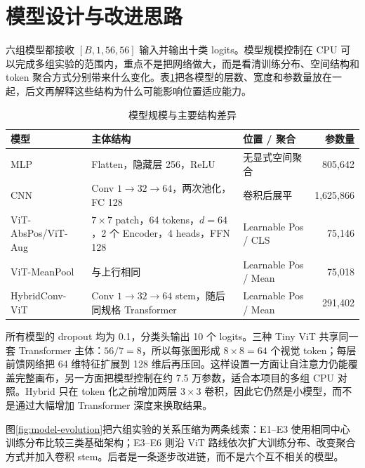 \section{模型设计与改进思路}

六组模型都接收 $[B,1,56,56]$ 输入并输出十类 logits。模型规模控制在 CPU 可以完成多组实验的范围内，重点不是把网络做大，而是看清训练分布、空间结构和 token 聚合方式分别带来什么变化。表\ref{tab:model-scale}把各模型的层数、宽度和参数量放在一起，后文再解释这些结构为什么可能影响位置适应能力。

\begin{table}[H]
  \centering
  \caption{模型规模与主要结构差异}
  \label{tab:model-scale}
  \renewcommand{\arraystretch}{1.16}
  \begin{tabularx}{\textwidth}{>{\raggedright\arraybackslash}p{}>{\raggedright\arraybackslash}X>{\raggedright\arraybackslash}p{}r}
    \toprule
    模型 & 主体结构 & 位置 / 聚合 & 参数量 \\
    \midrule
    MLP & Flatten，隐藏层 256，ReLU & 无显式空间聚合 & 805,642 \\
    CNN & Conv $1\!\to\!32\!\to\!64$，两次池化，FC 128 & 卷积后展平 & 1,625,866 \\
    ViT-AbsPos/ViT-Aug & $7\times7$ patch，64 tokens，$d=64$，2 个 Encoder，4 heads，FFN 128 & Learnable Pos / CLS & 75,146 \\
    ViT-MeanPool & 与上行相同 & Learnable Pos / Mean & 75,018 \\
    HybridConv-ViT & Conv $1\!\to\!32\!\to\!64$ stem，随后同规格 Transformer & Learnable Pos / Mean & 291,402 \\
    \bottomrule
  \end{tabularx}
\end{table}

所有模型的 dropout 均为 0.1，分类头输出 10 个 logits。三种 Tiny ViT 共享同一套 Transformer 主体：$56/7=8$，所以每张图形成 $8\times8=64$ 个视觉 token；每层前馈网络把 64 维特征扩展到 128 维后再压回。这样设置一方面让自注意力仍能覆盖完整画布，另一方面把模型控制在约 7.5 万参数，适合本项目的多组 CPU 对照。Hybrid 只在 token 化之前增加两层 $3\times3$ 卷积，因此它仍然是小模型，而不是通过大幅增加 Transformer 深度来换取结果。

图\ref{fig:model-evolution}把六组实验的关系压缩为两条线索：E1--E3 使用相同中心训练分布比较三类基础架构；E3--E6 则沿 ViT 路线依次扩大训练分布、改变聚合方式并加入卷积 stem。后者是一条逐步改进链，而不是六个互不相关的模型。

